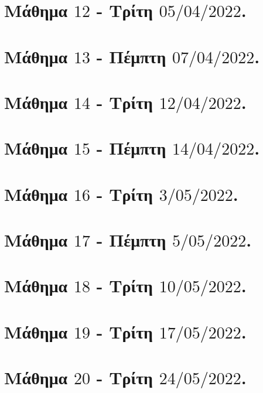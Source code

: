 \documentclass[oneside,a4paper]{article}
\begin{document}
\pagebreak


\section*{Μάθημα $12$ - Τρίτη $05/04/2022$.}
\vspace{0.3truecm}


\pagebreak

\section*{Μάθημα $13$ - Πέμπτη $07/04/2022$.}
\vspace{0.3truecm}


\pagebreak



\section*{Μάθημα $14$ - Τρίτη $12/04/2022$.}
\vspace{0.3truecm}


\pagebreak

\section*{Μάθημα $15$ - Πέμπτη $14/04/2022$.}
\vspace{0.3truecm}


\pagebreak

\section*{Μάθημα $16$ - Τρίτη $3/05/2022$.}
\vspace{0.3truecm}


\pagebreak

\section*{Μάθημα $17$ - Πέμπτη $5/05/2022$.}
\vspace{0.3truecm}


\pagebreak

\section*{Μάθημα $18$ - Τρίτη $10/05/2022$.}
\vspace{0.3truecm}


\pagebreak

\section*{Μάθημα $19$ - Τρίτη $17/05/2022$.}
\vspace{0.3truecm}


\pagebreak

\section*{Μάθημα $20$ - Τρίτη $24/05/2022$.}
\vspace{0.3truecm}


\pagebreak
\end{document}
